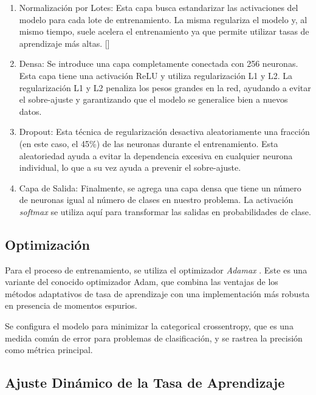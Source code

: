 \begin{enumerate}
   \item Normalización por Lotes: Esta capa busca estandarizar las activaciones del modelo para cada lote de entrenamiento. 
   La misma regulariza el modelo y, al mismo tiempo, suele acelera el entrenamiento ya que permite utilizar tasas de aprendizaje más altas. [\cite{regularization}]

   \item Densa: Se introduce una capa completamente conectada con 256 neuronas. Esta capa tiene una activación ReLU y utiliza regularización L1 y L2.
   La regularización L1 y L2 penaliza los pesos grandes en la red, ayudando a evitar el sobre-ajuste y garantizando que el modelo se generalice
    bien a nuevos datos. \cite{dense}
   
   \item Dropout: Esta técnica de regularización desactiva aleatoriamente una fracción (en este caso, el 45\%) de las neuronas durante el 
   entrenamiento. Esta aleatoriedad ayuda a evitar la dependencia excesiva en cualquier neurona individual, lo que a su vez ayuda a prevenir
    el sobre-ajuste. \cite{dropout}
   
   \item Capa de Salida: Finalmente, se agrega una capa densa que tiene un número de neuronas igual al número de clases en nuestro problema. 
   La activación \textit{softmax} se utiliza aquí para transformar las salidas en probabilidades de clase.

\end{enumerate}

\subsection{Optimización}

Para el proceso de entrenamiento, se utiliza el optimizador \textit{Adamax} \cite{adamax}. Este es una variante del conocido optimizador Adam, que combina las ventajas de los métodos adaptativos de tasa de aprendizaje con una implementación más robusta en presencia de momentos espurios. 

Se configura el modelo para minimizar la categorical crossentropy, que es una medida común de error para problemas de clasificación, y se rastrea la precisión como métrica principal.

\subsection{Ajuste Dinámico de la Tasa de Aprendizaje}

